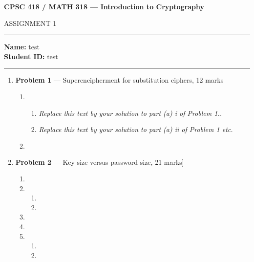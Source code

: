 \documentclass[11pt]{article}
\theoremstyle{definition}
\begin{document}
	\begin{center}
		{\bf \Large CPSC 418 / MATH 318 --- Introduction to Cryptography
		
		ASSIGNMENT 1 %
		}
	\end{center}
	
	\hrule 	
	
	\textbf{Name:} test  \\
	\textbf{Student ID:} test 
	
	\medskip \hrule
	
	\begin{enumerate}
	
		\item[] \textbf{Problem 1} --- Superencipherment for substitution ciphers, 12 marks
	
	\begin{enumerate}
		\item
	\begin{enumerate}
		\item \emph{Replace this text by your solution to part (a) i of Problem 1..}
	
		\item \emph{Replace this text by your solution to part (a) ii of Problem 1 etc.}
	\end{enumerate}
	
		\item
	\end{enumerate}
	
	
		\item[] \textbf{Problem 2} --- Key size versus password size, 21 marks]
	
	
	
	\begin{enumerate}
		\item
		\item
		
	\begin{enumerate}
		\item
		\item
	\end{enumerate}
		
		\item
		
		\item
		
		\item
		\begin{enumerate}
			\item
			
			\item
		\end{enumerate}
	\end{enumerate}
	

\end{enumerate}
\end{document}
